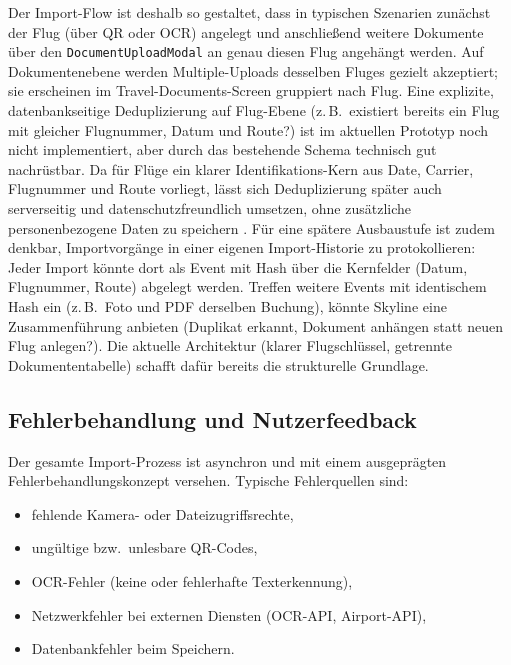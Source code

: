 Der Import-Flow ist deshalb so gestaltet, dass in typischen Szenarien zunächst der Flug (über QR oder OCR) angelegt und anschließend weitere Dokumente über den \texttt{DocumentUploadModal} an genau diesen Flug angehängt werden.
Auf Dokumentenebene werden Multiple-Uploads desselben Fluges gezielt akzeptiert; sie erscheinen im Travel-Documents-Screen gruppiert nach Flug.
Eine explizite, datenbankseitige Deduplizierung auf Flug-Ebene (z.\,B.\ \glqq existiert bereits ein Flug mit gleicher Flugnummer, Datum und Route?\grqq) ist im aktuellen Prototyp noch nicht implementiert, aber durch das bestehende Schema technisch gut nachrüstbar.
Da für Flüge ein klarer Identifikations-Kern aus Date, Carrier, Flugnummer und Route vorliegt, lässt sich Deduplizierung später auch serverseitig und datenschutzfreundlich umsetzen, ohne zusätzliche personenbezogene Daten zu speichern \cite{iataBCBP}.
Für eine spätere Ausbaustufe ist zudem denkbar, Importvorgänge in einer eigenen \glqq Import-Historie\grqq{} zu protokollieren:
Jeder Import könnte dort als Event mit Hash über die Kernfelder (Datum, Flugnummer, Route) abgelegt werden.
Treffen weitere Events mit identischem Hash ein (z.\,B.\ Foto und PDF derselben Buchung), könnte Skyline eine Zusammenführung anbieten (\glqq Duplikat erkannt, Dokument anhängen statt neuen Flug anlegen?\grqq).
Die aktuelle Architektur (klarer Flugschlüssel, getrennte Dokumententabelle) schafft dafür bereits die strukturelle Grundlage.

\subsection{Fehlerbehandlung und Nutzerfeedback}

Der gesamte Import-Prozess ist asynchron und mit einem ausgeprägten Fehlerbehandlungskonzept versehen.
Typische Fehlerquellen sind:

\begin{itemize}
  \item fehlende Kamera- oder Dateizugriffsrechte,
  \item ungültige bzw.\ unlesbare QR-Codes,
  \item OCR-Fehler (keine oder fehlerhafte Texterkennung),
  \item Netzwerkfehler bei externen Diensten (OCR-API, Airport-API),
  \item Datenbankfehler beim Speichern.
\end{itemize}

